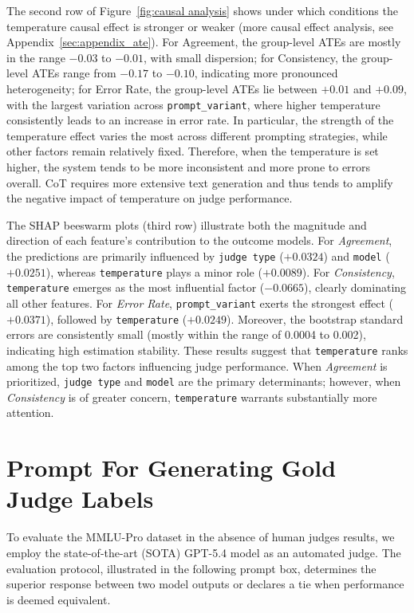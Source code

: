 \documentclass[11pt]{article}
\begin{document}
The second row of Figure~\ref{fig:causal analysis} shows under which conditions the temperature causal effect is stronger or weaker (more causal effect analysis, see Appendix~\ref{sec:appendix_ate}). For Agreement, the group-level ATEs are mostly in the range $-0.03$ to $-0.01$, with small dispersion; 
for Consistency, the group-level ATEs range from $-0.17$ to $-0.10$, indicating more pronounced heterogeneity; 
for Error Rate, the group-level ATEs lie between $+0.01$ and $+0.09$, with the largest variation across \texttt{prompt\_variant}, where higher temperature consistently leads to an increase in error rate. 
In particular, the strength of the temperature effect varies the most across different prompting strategies, while other factors remain relatively fixed. 
Therefore, when the temperature is set higher, the system tends to be more inconsistent and more prone to errors overall. 
CoT requires more extensive text generation and thus tends to amplify the negative impact of temperature on judge performance.



The SHAP beeswarm plots (third row) illustrate both the magnitude and direction of each feature’s contribution to the outcome models. For \textit{Agreement}, the predictions are primarily influenced by \texttt{judge type} ($+0.0324$) and \texttt{model} ($+0.0251$), whereas \texttt{temperature} plays a minor role ($+0.0089$). For \textit{Consistency}, \texttt{temperature} emerges as the most influential factor ($-0.0665$), clearly dominating all other features. For \textit{Error Rate}, \texttt{prompt\_variant} exerts the strongest effect ($+0.0371$), followed by \texttt{temperature} ($+0.0249$). Moreover, the bootstrap standard errors are consistently small (mostly within the range of 0.0004 to 0.002), indicating high estimation stability. These results suggest that \texttt{temperature} ranks among the top two factors influencing judge performance. When \textit{Agreement} is prioritized, \texttt{judge type} and \texttt{model} are the primary determinants; however, when \textit{Consistency} is of greater concern, \texttt{temperature} warrants substantially more attention.




\section{Prompt For Generating Gold Judge Labels}
\label{appendix:judge_prompt_4.5}

To evaluate the MMLU-Pro dataset in the absence of human judges results, we employ the state-of-the-art (SOTA) GPT-5.4 model as an automated judge. 
The evaluation protocol, illustrated in the following prompt box, determines the superior response between two model outputs or declares a tie when performance is deemed equivalent.
\end{document}
